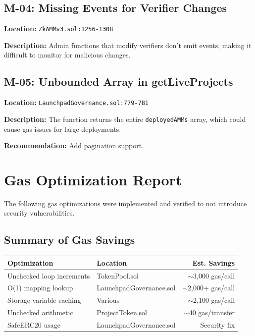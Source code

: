 \documentclass[11pt,a4paper]{article}
\begin{document}
\begin{mediumbox}
\subsection{M-04: Missing Events for Verifier Changes}
\end{mediumbox}

\textbf{Location:} \texttt{ZkAMMv3.sol:1256-1308}

\textbf{Description:}
Admin functions that modify verifiers don't emit events, making it difficult to monitor for malicious changes.

\vspace{1em}

\begin{mediumbox}
\subsection{M-05: Unbounded Array in getLiveProjects}
\end{mediumbox}

\textbf{Location:} \texttt{LaunchpadGovernance.sol:779-781}

\textbf{Description:}
The function returns the entire \texttt{deployedAMMs} array, which could cause gas issues for large deployments.

\textbf{Recommendation:} Add pagination support.

\newpage

\section{Gas Optimization Report}

The following gas optimizations were implemented and verified to not introduce security vulnerabilities.

\subsection{Summary of Gas Savings}

\begin{center}
\begin{tabular}{|l|l|r|}
\hline
\textbf{Optimization} & \textbf{Location} & \textbf{Est. Savings} \\
\hline
Unchecked loop increments & TokenPool.sol & $\sim$3,000 gas/call \\
O(1) mapping lookup & LaunchpadGovernance.sol & $\sim$2,000+ gas/call \\
Storage variable caching & Various & $\sim$2,100 gas/call \\
Unchecked arithmetic & ProjectToken.sol & $\sim$40 gas/transfer \\
SafeERC20 usage & LaunchpadGovernance.sol & Security fix \\
\hline
\end{tabular}
\end{center}
\end{document}
